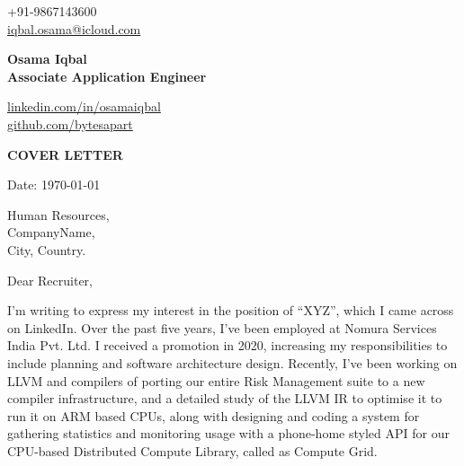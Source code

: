 \documentclass[11pt,a4paper]{article}
\begin{document}

\begin{center}
    \begin{minipage}[b]{0.24\textwidth}
            \large +91-9867143600 \\
            \large \href{mailto:iqbal.osama@icloud.com}{iqbal.osama@icloud.com} 
    \end{minipage}%
    \begin{minipage}[b]{0.5\textwidth}
            \centering
            {\Huge \textbf{Osama Iqbal}} \\ 
            \vspace{0.1cm}
            {\color{CarianBlue}\Large{\textbf{Associate Application Engineer}}}
    \end{minipage}%
    \begin{minipage}[b]{0.28\textwidth}
            \flushright \large
            {\href{https://www.linkedin.com/in/osamaiqbal/}{linkedin.com/in/osamaiqbal} } \\
            \href{https://github.com/bytesapart}{github.com/bytesapart}
    \end{minipage}   
    
\vspace{-0.15cm} 
{\color{CarianBlue} \hrulefill}
\end{center}

\justify
\setlength{\parindent}{0pt}
\setlength{\parskip}{12pt}
\vspace{0.2cm}
\begin{center}
  {\color{CarianBlue} \Large{\textbf{COVER LETTER}}}
\end{center}


Date: \today \par \vspace{-0.1cm}

Human Resources, \\
CompanyName, \\
City, Country.


Dear Recruiter,  %

I'm writing to express my interest in the position of “XYZ”, which I came across on LinkedIn. Over the past five years, I've been employed at Nomura Services India Pvt. Ltd. I received a promotion in 2020, increasing my responsibilities to include planning and software architecture design. Recently, I've been working on LLVM and compilers of porting our entire Risk Management suite to a new compiler infrastructure, and a detailed study of the LLVM IR to optimise it to run it on ARM based CPUs, along with designing and coding a system for gathering statistics and monitoring usage with a phone-home styled API for our CPU-based Distributed Compute Library, called as Compute Grid. \par
 
\end{document}
